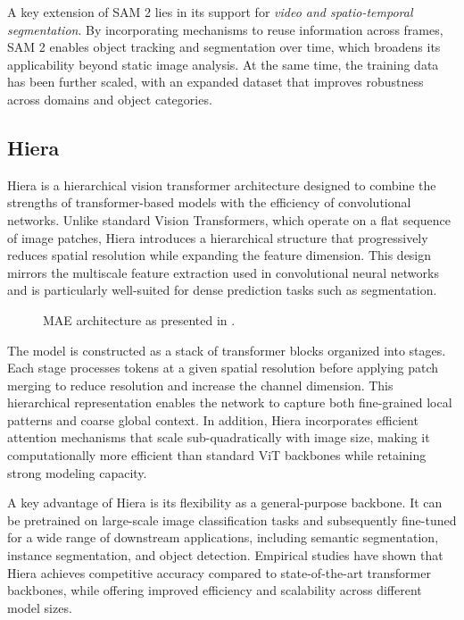 A key extension of SAM 2 lies in its support for \textit{video and spatio-temporal segmentation}. By incorporating mechanisms to reuse information across frames, SAM 2 enables object tracking and segmentation over time, which broadens its applicability beyond static image analysis. At the same time, the training data has been further scaled, with an expanded dataset that improves robustness across domains and object categories. 


\subsection{Hiera}
Hiera is a hierarchical vision transformer architecture designed to combine the strengths of transformer-based models with the efficiency of convolutional networks. Unlike standard Vision Transformers, which operate on a flat sequence of image patches, Hiera introduces a hierarchical structure that progressively reduces spatial resolution while expanding the feature dimension. This design mirrors the multiscale feature extraction used in convolutional neural networks and is particularly well-suited for dense prediction tasks such as segmentation. 

\begin{figure}[!ht]
    \centering
    \caption{MAE architecture as presented in \cite{LeCun.1989}.}
    \label{fig:Hiera}
\end{figure}

The model is constructed as a stack of transformer blocks organized into stages. Each stage processes tokens at a given spatial resolution before applying patch merging to reduce resolution and increase the channel dimension. This hierarchical representation enables the network to capture both fine-grained local patterns and coarse global context. In addition, Hiera incorporates efficient attention mechanisms that scale sub-quadratically with image size, making it computationally more efficient than standard ViT backbones while retaining strong modeling capacity. 

A key advantage of Hiera is its flexibility as a general-purpose backbone. It can be pretrained on large-scale image classification tasks and subsequently fine-tuned for a wide range of downstream applications, including semantic segmentation, instance segmentation, and object detection. Empirical studies have shown that Hiera achieves competitive accuracy compared to state-of-the-art transformer backbones, while offering improved efficiency and scalability across different model sizes. 


